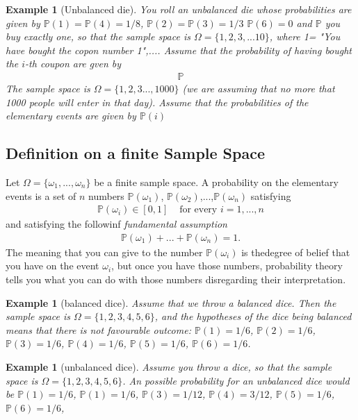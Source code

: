 \documentclass[12pt]{article}
\newtheorem{example}[theorem]{Example}
\newcommand{\<}{{\langle \!\! \langle}}
\renewcommand{\>}{{\rangle \!\! \rangle}}
\newcommand{\bel}[2]{\begin{equation} \label{#1} \begin{split} #2
 					\end{split} \end{equation}}
\begin{document}
\begin{example}[Unbalanced die]
You roll an unbalanced die whose probabilities are given by $\mathbb{P}(1)=\mathbb{P}(4)=1/8$, $\mathbb{P}(2)=\mathbb{P}(3)=1/3$ $\mathbb{P}(6)=0$ and $\mathbb{P}$ you buy exactly one, so that the sample space is $\Omega=\{1,2,3,...10\}$, where 1= "You have bought the copon number 1",.... Assume that the probability of having bought the $i$-th coupon are gven by 
\bel{}{ \mathbb{P}}  The sample space is $\Omega=\{1,2,3...,1000\}$ (we are assuming that no more that 1000 people will enter in that day). Assume that the probabilities of the elementary events are given by $\mathbb{P}(i)$
\end{example}


\subsection{Definition on a finite Sample Space}

Let $\Omega=\{\omega_1,...,\omega_n\}$ be a finite sample space. A probability on the elementary events
is a set of $n$ numbers $\mathbb{P}(\omega_1)$, $\mathbb{P}(\omega_2)$,...,$\mathbb{P}(\omega_n)$ satisfying 
\bel{e:pos}{\mathbb{P}(\omega_i)\in[0,1] & \textrm{ for every } i=1,...,n} 
and satisfying the followinf \emph{ fundamental assumption }
\bel{e:fun}{\mathbb{P}(\omega_1)+...+\mathbb{P}(\omega_n)=1.}
The meaning that you can give to the number $\mathbb{P}(\omega_i)$ is thedegree of belief that you have on the event $\omega_i$, but once you have those numbers, probability theory tells you what you can do with those numbers disregarding their interpretation.

\begin{example}[balanced dice]
	Assume that we throw a balanced dice. Then the sample space is $\Omega=\{1,2,3,4,5,6\}$, and the hypotheses of the dice being balanced means that there is not favourable outcome:  $ \mathbb{P}(1)=1/6$, $ \mathbb{P}(2)=1/6$, $ \mathbb{P}(3)=1/6$, $ \mathbb{P}(4)=1/6$, $ \mathbb{P}(5)=1/6$, $ \mathbb{P}(6)=1/6$.
\end{example}
\begin{example}[unbalanced dice]
	Assume you throw a dice, so that the sample space is $\Omega=\{1,2,3,4,5,6\}$. An possible probability for an unbalanced dice would be $ \mathbb{P}(1)=1/6$,  $ \mathbb{P}(1)=1/6$, $ \mathbb{P}(3)=1/12$, $ \mathbb{P}(4)=3/12$, $ \mathbb{P}(5)=1/6$, $ \mathbb{P}(6)=1/6$,
\end{example}
\end{document}
